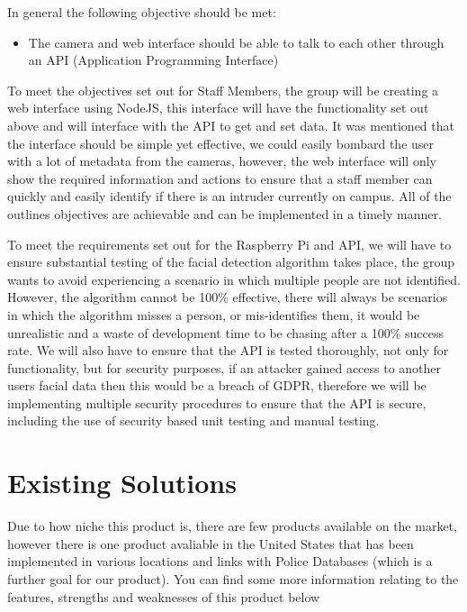 \documentclass[
  english,
  a4paper,
,tablecaptionabove
]{scrartcl}
\providecommand{\tightlist}{%
  \setlength{\itemsep}{0pt}\setlength{\parskip}{0pt}}
\begin{document}
In general the following objective should be met:

\begin{itemize}
\tightlist
\item
  The camera and web interface should be able to talk to each other
  through an API (Application Programming Interface)
\end{itemize}

To meet the objectives set out for Staff Members, the group will be
creating a web interface using NodeJS, this interface will have the
functionality set out above and will interface with the API to get and
set data. It was mentioned that the interface should be simple yet
effective, we could easily bombard the user with a lot of metadata from
the cameras, however, the web interface will only show the required
information and actions to ensure that a staff member can quickly and
easily identify if there is an intruder currently on campus. All of the
outlines objectives are achievable and can be implemented in a timely
manner.

To meet the requirements set out for the Raspberry Pi and API, we will
have to ensure substantial testing of the facial detection algorithm
takes place, the group wants to avoid experiencing a scenario in which
multiple people are not identified. However, the algorithm cannot be
100\% effective, there will always be scenarios in which the algorithm
misses a person, or mis-identifies them, it would be unrealistic and a
waste of development time to be chasing after a 100\% success rate. We
will also have to ensure that the API is tested thoroughly, not only for
functionality, but for security purposes, if an attacker gained access
to another users facial data then this would be a breach of GDPR,
therefore we will be implementing multiple security procedures to ensure
that the API is secure, including the use of security based unit testing
and manual testing.

\newpage

\hypertarget{existing-solutions}{%
\section{Existing Solutions}\label{existing-solutions}}

Due to how niche this product is, there are few products available on
the market, however there is one product avaliable in the United States
that has been implemented in various locations and links with Police
Databases (which is a further goal for our product). You can find some
more information relating to the features, strengths and weaknesses of
this product below
\end{document}
